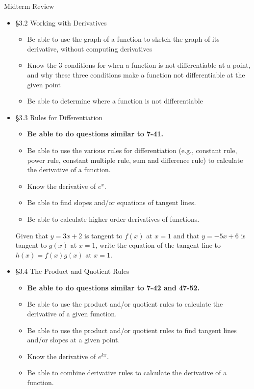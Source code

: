 \documentclass[cal1spr16Lectures.tex]{subfiles}
\begin{document}
\begin{frame}[allowframebreaks]{Midterm Review}
\begin{itemize}
\framebreak
\item \S 3.2 Working with Derivatives
	\begin{itemize}\footnotesize
	\item Be able to use the graph of a function to sketch the graph of its derivative, without computing derivatives
	\item Know the 3 conditions for when a function is not differentiable at a point, and why these three conditions make a function not differentiable at the given point
	\item Be able to determine where a function is not differentiable
	\end{itemize}
%
\framebreak	
\item \S 3.3 Rules for Differentiation
	\begin{itemize}\footnotesize
	\item {\bf Be able to do questions similar to 7-41.}
	\item Be able to use the various rules for differentiation (e.g., constant rule, power rule, constant multiple rule, sum and difference rule) to calculate the derivative of a function.
	\item Know the derivative of $e^x$.
	\item Be able to find slopes and/or equations of tangent lines.
	\item Be able to calculate higher-order derivatives of functions.
	\end{itemize}
%
\framebreak
\begin{exe}
Given that $y=3x+2$ is tangent to $f(x)$ at $x=1$ and that $y=-5x+6$ is tangent to $g(x)$ at $x=1$, write the equation of the tangent line to $h(x)=f(x)g(x)$ at $x=1$.
\end{exe}
%
\framebreak
\item \S 3.4 The Product and Quotient Rules
	\begin{itemize}\footnotesize
	\item {\bf Be able to do questions similar to 7-42 and 47-52.}
	\item Be able to use the product and/or quotient rules to calculate the derivative of a given function.
	\item Be able to use the product and/or quotient rules to find tangent lines and/or slopes at a given point.
	\item Know the derivative of $e^{kx}$.
	\item Be able to combine derivative rules to calculate the derivative of a function.
	\end{itemize}
	

\end{itemize}
\end{frame}
\end{document}
